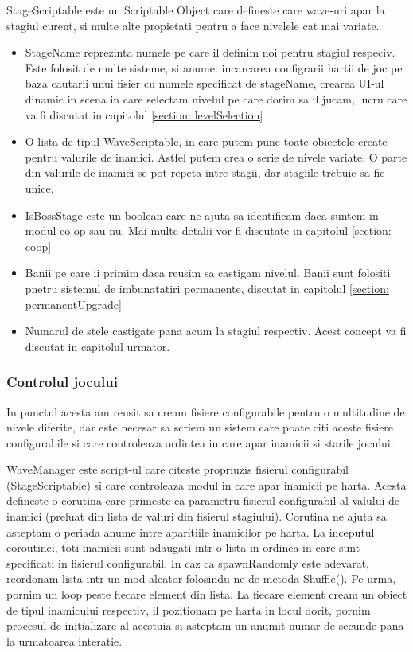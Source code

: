 \documentclass[12pt, a4paper]{article}
\begin{document}
	StageScriptable este un Scriptable Object care defineste care wave-uri apar la stagiul curent, si multe alte propietati pentru a face nivelele cat mai variate.
	
	\begin{itemize}
		\item StageName reprezinta numele pe care il definim noi pentru stagiul respeciv. Este folosit de multe sisteme, si anume: incarcarea configrarii hartii de joc pe baza cautarii unui fisier cu numele specificat de stageName, crearea UI-ul dinamic in scena in care selectam nivelul pe care dorim sa il jucam, lucru care va fi discutat in capitolul \ref{section: levelSelection}
		\item O lista de tipul WaveScriptable, in care putem pune toate obiectele create pentru valurile de inamici. Astfel putem crea o serie de nivele variate. O parte din valurile de inamici se pot repeta intre stagii, dar stagiile trebuie sa fie unice.
		\item IsBossStage este un boolean care ne ajuta sa identificam daca suntem in modul co-op sau nu. Mai multe detalii vor fi discutate in capitolul \ref{section: coop} 
		\item Banii pe care ii primim daca reusim sa castigam nivelul. Banii sunt folositi pnetru sistemul de imbunatatiri permanente, discutat in capitolul \ref{section: permanentUpgrade}
		\item Numarul de stele castigate pana acum la stagiul respectiv. Acest concept va fi discutat in capitolul urmator.
	\end{itemize}
	
	
	
	
	
	\subsubsection{Controlul jocului}
	\label{section: gameState}
	
	In punctul acesta am reusit sa cream fisiere configurabile pentru o multitudine de nivele diferite, dar este necesar sa scriem un sistem care poate citi aceste fisiere configurabile si care controleaza ordintea in care apar inamicii si starile jocului.
	\newline
	
	WaveManager este script-ul care citeste propriuzis fisierul configurabil (StageScriptable) si care controleaza modul in care apar inamicii pe harta. Acesta defineste o corutina care primeste ca parametru fisierul configurabil al valului de inamici (preluat din lista de valuri din fisierul stagiului). Corutina ne ajuta sa asteptam o periada anume intre aparitiile inamicilor pe harta. La inceputul coroutinei, toti inamicii sunt adaugati intr-o lista in ordinea in care sunt specificati in fisierul configurabil. In caz ca spawnRandomly este adevarat, reordonam lista intr-un mod aleator folosindu-ne de metoda Shuffle(). Pe urma, pornim un loop peste fiecare element din lista. La fiecare element cream un obiect de tipul inamicului respectiv, il pozitionam pe harta in locul dorit, pornim procesul de initializare al acestuia si asteptam un anumit numar de secunde pana la urmatoarea interatie.
	\newline
	
\end{document}
